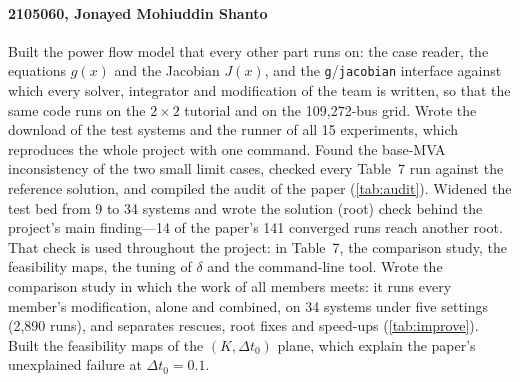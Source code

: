 \documentclass[sigconf,nonacm]{acmart}
\newcommand{\code}[1]{\texttt{#1}}
\begin{document}
\paragraph{2105060, Jonayed Mohiuddin Shanto}
Built the power flow model that every other part runs on: the case reader, the
equations $g(x)$ and the Jacobian $J(x)$, and the \code{g}/\code{jacobian} interface against which every
solver, integrator and modification of the team is written, so that the same code runs on the $2\times2$
tutorial and on the 109{,}272-bus grid. Wrote the download of the test systems and the runner of all 15
experiments, which reproduces the whole project with one command. Found the base-MVA inconsistency of the
two small limit cases, checked every Table~7 run against the reference solution, and compiled the audit of
the paper (\cref{tab:audit}). Widened the test bed from 9 to 34 systems and wrote the solution (root) check
behind the project's main finding---14 of the paper's 141 converged runs reach another root. That check is
used throughout the project: in Table~7, the comparison study, the feasibility maps, the tuning of $\delta$
and the command-line tool. Wrote the comparison study in which the work of all members meets: it runs
every member's modification, alone and combined, on 34 systems under five settings (2{,}890 runs), and
separates rescues, root fixes and speed-ups (\cref{tab:improve}). Built the feasibility maps of the
$(K,\Delta t_0)$ plane, which explain the paper's unexplained failure at $\Delta t_0=0.1$.
\end{document}

